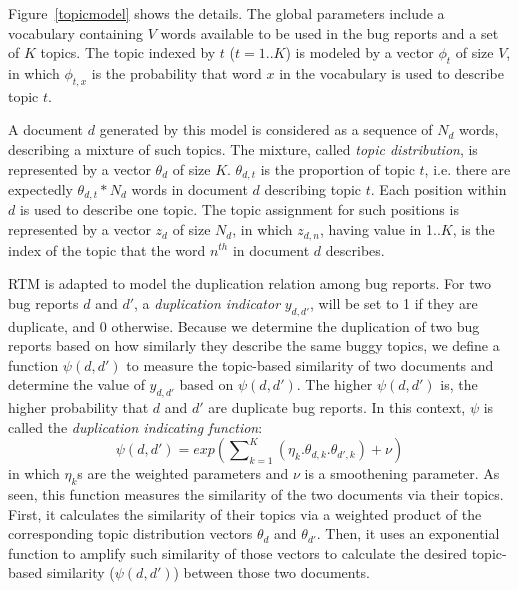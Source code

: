 

Figure~\ref{topicmodel} shows the details.  The global
parameters include a vocabulary containing $V$ words available to be
used in the bug reports and a set of $K$ topics. The topic indexed by
$t$ ($t=1..K$) is modeled by a vector $\phi_t$ of size $V$, in which
$\phi_{t,x}$ is the probability that word $x$ in the vocabulary is
used to describe topic $t$.

A document $d$ generated by this model is considered as a sequence of
$N_d$ words, describing a mixture of such topics. The mixture, called
{\em topic distribution}, is represented by a vector $\theta_d$ of
size $K$. $\theta_{d,t}$ is the proportion of topic $t$, i.e. there
are expectedly $\theta_{d,t}*N_d$ words in document $d$ describing
topic $t$. Each position within $d$ is used to describe one topic. The
topic assignment for such positions is represented by a vector $z_d$
of size $N_d$, in which $z_{d,n}$, having value in 1..$K$, is the
index of the topic that the word $n^{th}$ in document $d$ describes.

\vspace{0.04in}
RTM is adapted to model the duplication relation among bug
reports. For two bug reports $d$ and $d'$, a {\em duplication
indicator} $y_{d,d'}$, will be set to 1 if they are duplicate, and 0
otherwise. Because we determine the duplication of two bug reports
based on how similarly they describe the same buggy topics, we define
a function $\psi(d,d')$ to measure the topic-based similarity of two
documents and determine the value of $y_{d,d'}$ based on
$\psi(d,d')$. The higher $\psi(d,d')$ is, the higher
probability that $d$ and $d'$ are duplicate bug reports. In this
context, $\psi$ is called the {\em duplication indicating
  function}:
$$\psi(d, d') = exp({\sum\nolimits_{k=1}^K(\eta_k.\theta_{d,k}.\theta_{d',k})+
\nu})$$ in which $\eta_k$s are the weighted parameters and $\nu$ is a
smoothening parameter. As seen, this function measures the similarity of
the two documents via their topics. First, it calculates the
similarity of their topics via a weighted product of the corresponding
topic distribution vectors $\theta_d$ and $\theta_{d'}$. Then, it uses
an exponential function to amplify such similarity of those
vectors to calculate the desired topic-based similarity ($\psi(d,d')$)
between those two documents.

